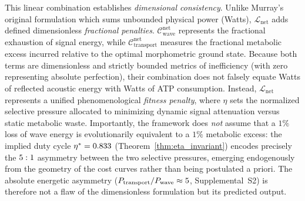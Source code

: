 \documentclass[11pt,a4paper]{article}
\theoremstyle{remark}
\begin{document}
This linear combination establishes \emph{dimensional consistency}. Unlike
Murray's original formulation which sums unbounded physical power (Watts),
$\mathcal{L}_\mathrm{net}$ adds defined dimensionless \emph{fractional
penalties}. $\mathcal{C}_\mathrm{wave}^\mathrm{net}$ represents the fractional
exhaustion of signal energy, while $\mathcal{C}_\mathrm{transport}^\mathrm{net}$
measures the fractional metabolic excess incurred relative to the optimal
morphometric ground state. Because both terms are dimensionless and strictly
bounded metrics of inefficiency (with zero representing absolute perfection),
their combination does not falsely equate Watts of reflected acoustic energy
with Watts of ATP consumption. Instead, $\mathcal{L}_\mathrm{net}$ represents a
unified phenomenological \emph{fitness penalty}, where $\eta$ sets the
normalized selective pressure allocated to minimizing dynamic signal attenuation
versus static metabolic waste. Importantly, the framework does \emph{not} assume
that a $1\%$ loss of wave energy is evolutionarily equivalent to a $1\%$
metabolic excess: the implied duty cycle $\eta^* = 0.833$
(Theorem~\ref{thm:eta_invariant}) encodes precisely the $5:1$
asymmetry between the two selective pressures, emerging endogenously from the
geometry of the cost curves rather than being postulated a priori. The absolute
energetic asymmetry ($P_\mathrm{transport}/P_\mathrm{wave} \approx
5$, Supplemental~S2) is therefore not a flaw of the
dimensionless formulation but its predicted output.
\end{document}
